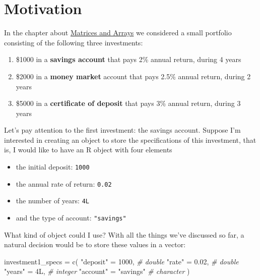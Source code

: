 \documentclass[
]{book}
\newenvironment{Shaded}{\begin{snugshade}}{\end{snugshade}}
\newcommand{\CommentTok}[1]{\textcolor[rgb]{0.56,0.35,0.01}{\textit{#1}}}
\newcommand{\DecValTok}[1]{\textcolor[rgb]{0.00,0.00,0.81}{#1}}
\newcommand{\FloatTok}[1]{\textcolor[rgb]{0.00,0.00,0.81}{#1}}
\newcommand{\FunctionTok}[1]{\textcolor[rgb]{0.00,0.00,0.00}{#1}}
\newcommand{\NormalTok}[1]{#1}
\newcommand{\OtherTok}[1]{\textcolor[rgb]{0.56,0.35,0.01}{#1}}
\newcommand{\StringTok}[1]{\textcolor[rgb]{0.31,0.60,0.02}{#1}}
\providecommand{\tightlist}{%
  \setlength{\itemsep}{0pt}\setlength{\parskip}{0pt}}
\begin{document}
\hypertarget{motivation-2}{%
\section{Motivation}\label{motivation-2}}

In the chapter about \protect\hyperlink{matrices1}{Matrices and Arrays} we considered a small
portfolio consisting of the following three investments:

\begin{enumerate}
\def\labelenumi{\alph{enumi})}
\item
  \$1000 in a \textbf{savings account} that pays 2\% annual return, during 4 years
\item
  \$2000 in a \textbf{money market} account that pays 2.5\% annual return, during
  2 years
\item
  \$5000 in a \textbf{certificate of deposit} that pays 3\% annual return, during
  3 years
\end{enumerate}

Let's pay attention to the first investment: the savings account. Suppose I'm
interested in creating an object to store the specifications of this investment,
that is, I would like to have an R object with four elements

\begin{itemize}
\tightlist
\item
  the initial deposit: \texttt{1000}
\item
  the annual rate of return: \texttt{0.02}
\item
  the number of years: \texttt{4L}
\item
  and the type of account: \texttt{"savings"}
\end{itemize}

What kind of object could I use? With all the things we've discussed so far,
a natural decision would be to store these values in a vector:

\begin{Shaded}
\begin{Highlighting}[]
\NormalTok{investment1\_specs }\OtherTok{=} \FunctionTok{c}\NormalTok{(}
  \StringTok{"deposit"} \OtherTok{=} \DecValTok{1000}\NormalTok{,      }\CommentTok{\# double}
  \StringTok{"rate"} \OtherTok{=} \FloatTok{0.02}\NormalTok{,         }\CommentTok{\# double}
  \StringTok{"years"} \OtherTok{=}\NormalTok{ 4L,          }\CommentTok{\# integer}
  \StringTok{"account"} \OtherTok{=} \StringTok{"savings"}  \CommentTok{\# character}
\NormalTok{)}
\end{Highlighting}
\end{Shaded}
\end{document}
